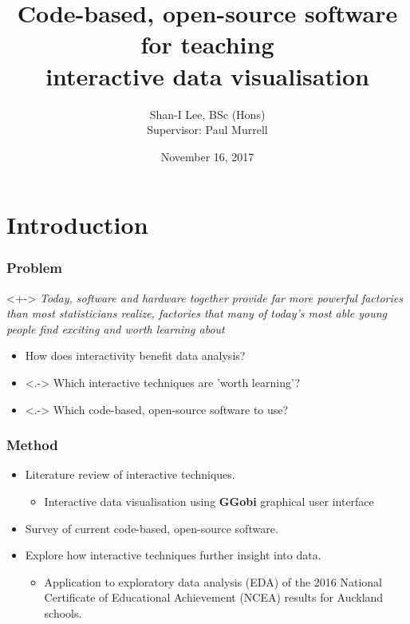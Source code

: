 \documentclass{beamer}
\begin{document}
	\title{Code-based, open-source software for teaching \\ interactive data visualisation}
	
	\date{November 16, 2017}		
	\author{Shan-I Lee, BSc (Hons)\\ Supervisor: Paul Murrell}
	

		\titlepage

	
\section{Introduction}
\label{sec:introduction}
	
	\begin{frame}
		\frametitle{Problem}
		\begin{block}{\citet[p.~25]{Tukey}}<+->
			\textit{Today, software and hardware together provide far more powerful factories than most statisticians realize, factories that many of today's most able young people find exciting and worth learning about} 
		\end{block}
	\begin{itemize}[<+->]
		\item How does interactivity benefit data analysis?
		\item <.-> Which interactive techniques are 'worth learning'? 
		\item <.-> Which code-based, open-source software to use? 
	\end{itemize}
	\end{frame}

	\begin{frame}
		\frametitle{Method}
		\begin{itemize}
			\item Literature review of interactive techniques.
			\begin{itemize}
				\item Interactive data visualisation using \textbf{GGobi} graphical user interface \citep{Cook}
			\end{itemize}
			\item Survey of current code-based, open-source software.
			\item Explore how interactive techniques further insight into data.
			\begin{itemize}
				\item Application to exploratory data analysis (EDA) of the 2016 National Certificate of Educational Achievement (NCEA) results for Auckland schools.
			\end{itemize}
		\end{itemize}
	\end{frame}
\end{document}
